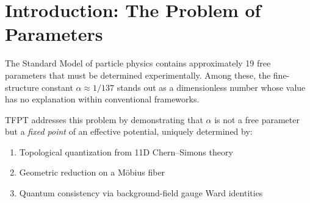 \tableofcontents
\newpage

\section{Introduction: The Problem of Parameters}

The Standard Model of particle physics contains approximately 19 free parameters 
that must be determined experimentally. Among these, the fine-structure constant 
$\alpha \approx 1/137$ stands out as a dimensionless number whose value has no 
explanation within conventional frameworks.

TFPT addresses this problem by demonstrating that $\alpha$ is not a free parameter 
but a \emph{fixed point} of an effective potential, uniquely determined by:
\begin{enumerate}[label=(\roman*)]
    \item Topological quantization from 11D Chern--Simons theory
    \item Geometric reduction on a M\"obius fiber
    \item Quantum consistency via background-field gauge Ward identities
\end{enumerate}

